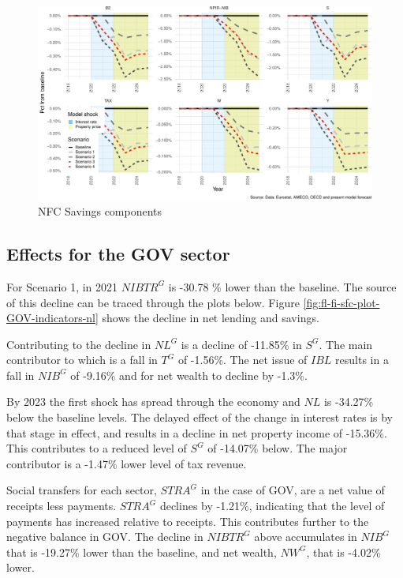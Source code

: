 \documentclass[
]{book}
\begin{document}
\begin{figure}
\centering
\includegraphics{figures/fl-fi-sfc-plot-nfc-indicators-saving-1.pdf}
\caption{\label{fig:fl-fi-sfc-plot-nfc-indicators-saving}NFC Savings components}
\end{figure}

\hypertarget{effects-for-the-gov-sector}{%
\subsection{Effects for the GOV sector}\label{effects-for-the-gov-sector}}

For Scenario 1, in 2021 \(NIBTR^G\) is -30.78 \% lower than the baseline. The source of this decline can be traced through the plots below. Figure \ref{fig:fl-fi-sfc-plot-GOV-indicators-nl} shows the decline in net lending and savings.

Contributing to the decline in \(NL^G\) is a decline of -11.85\% in \(S^G\). The main contributor to which is a fall in \(T^G\) of -1.56\%. The net issue of \(IBL\) results in a fall in \(NIB^G\) of -9.16\% and for net wealth to decline by -1.3\%.

By 2023 the first shock has spread through the economy and \(NL\) is -34.27\% below the baseline levels. The delayed effect of the change in interest rates is by that stage in effect, and results in a decline in net property income of -15.36\%. This contributes to a reduced level of \(S^G\) of -14.07\% below. The major contributor is a -1.47\% lower level of tax revenue.

Social transfers for each sector, \(STRA^G\) in the case of GOV, are a net value of receipts less payments. \(STRA^G\) declines by -1.21\%, indicating that the level of payments has increased relative to receipts. This contributes further to the negative balance in GOV. The decline in \(NIBTR^G\) above accumulates in \(NIB^G\) that is -19.27\% lower than the baseline, and net wealth, \(NW^G\), that is -4.02\% lower.
\end{document}
